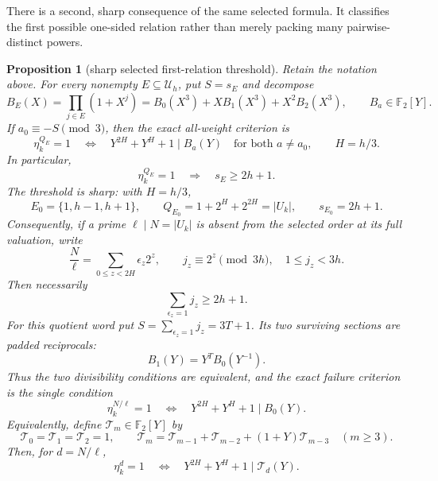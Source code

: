 \documentclass[11pt]{article}
\newtheorem{proposition}[theorem]{Proposition}
\theoremstyle{definition}
\theoremstyle{remark}
\begin{document}
There is a second, sharp consequence of the same selected formula.  It
classifies the first possible one-sided relation rather than merely packing
many pairwise-distinct powers.

\begin{proposition}[sharp selected first-relation threshold]
\label{prop:c-first-relation}
Retain the notation above.  For every nonempty $E\subseteq\mathcal U_h$,
put $S=s_E$ and decompose
\[
 B_E(X)=\prod_{j\in E}(1+X^j)
 =B_0(X^3)+XB_1(X^3)+X^2B_2(X^3),
 \qquad B_a\in\mathbb F_2[Y].
\]
If $a_0\equiv-S\pmod3$, then the exact all-weight criterion is
\[
 \eta_k^{Q_E}=1
 \quad\Longleftrightarrow\quad
 Y^{2H}+Y^H+1\mid B_a(Y)
 \quad\text{for both }a\ne a_0,
 \qquad H=h/3.
\]
In particular,
\[
 \eta_k^{Q_E}=1\quad\Longrightarrow\quad s_E\geq2h+1.
\]
The threshold is sharp: with $H=h/3$,
\[
 E_0=\{1,h-1,h+1\},\qquad
 Q_{E_0}=1+2^H+2^{2H}=|U_k|,\qquad s_{E_0}=2h+1.
\]
Consequently, if a prime $\ell\mid N=|U_k|$ is absent from the selected
order at its full valuation, write
\[
 \frac N\ell=\sum_{0\leq z<2H}\epsilon_z2^z,
 \qquad j_z\equiv2^z\pmod{3h},\quad1\leq j_z<3h.
\]
Then necessarily
\[
 \sum_{\epsilon_z=1}j_z\geq2h+1.
\]
For this quotient word put
$S=\sum_{\epsilon_z=1}j_z=3T+1$.  Its two surviving sections are padded
reciprocals:
\[
 B_1(Y)=Y^T B_0(Y^{-1}).
\]
Thus the two divisibility conditions are equivalent, and the exact failure
criterion is the single condition
\[
 \eta_k^{N/\ell}=1
 \quad\Longleftrightarrow\quad
 Y^{2H}+Y^H+1\mid B_0(Y).
\]
Equivalently, define $\mathcal T_m\in\mathbb F_2[Y]$ by
\[
 \mathcal T_0=\mathcal T_1=\mathcal T_2=1,
 \qquad
 \mathcal T_m=\mathcal T_{m-1}+\mathcal T_{m-2}
 +(1+Y)\mathcal T_{m-3}\quad(m\geq3).
\]
Then, for $d=N/\ell$,
\[
 \eta_k^d=1
 \quad\Longleftrightarrow\quad
 Y^{2H}+Y^H+1\mid\mathcal T_d(Y).
\]
\end{proposition}
\end{document}

